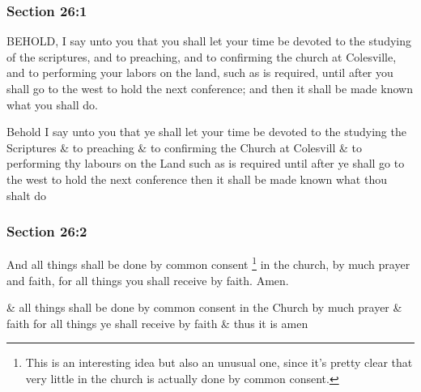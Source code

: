 	\subsubsection{Section 26:1} %
		\label{DC26-1}

		BEHOLD, I say unto you that you shall let your time be devoted to the studying of the scriptures, and to preaching, and to confirming the church at Colesville, and to performing your labors on the land, such as is required, until after you shall go to the west to hold the next conference; and then it shall be made known what you shall do.

		\begin{framed}
		\scriptsize
			\begin{compactdesc}
				\item[JSP] Behold I say unto you that ye shall let your time be devoted to the studying the Scriptures \& to preaching \& to confirming the Church at Colesvill \& to performing thy labours on the Land such as is required until after ye shall go to the west to hold the next conference then it shall be made known what thou shalt do
			\end{compactdesc}
		\end{framed}

	\subsubsection{Section 26:2} %
		\label{DC26-2}

		And all things shall be done by common consent%
		\footnote{%
			This is an interesting idea but also an unusual one, since it's pretty clear that very little in the church is actually done by common consent.
			} 
		in the church, by much prayer and faith, for all things you shall receive by faith.  Amen.

		\begin{framed}
		\scriptsize
			\begin{compactdesc}
				\item[JSP] \& all things shall be done by common consent in the Church by much prayer \& faith for all things ye shall receive by faith \& thus it is amen
			\end{compactdesc}
		\end{framed}